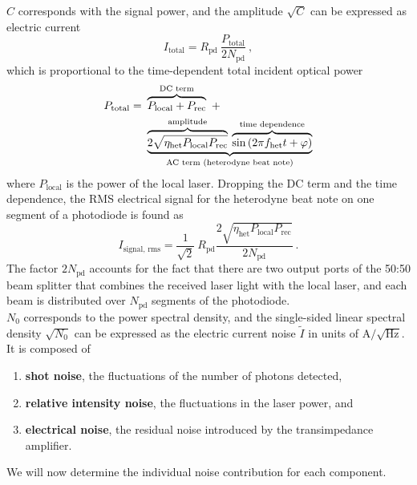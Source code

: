 \documentclass[fleqn,10pt]{<approot>/designer/latexelements/SelfArx} %
\begin{document}
$C$ corresponds with the signal power, and the amplitude $\sqrt{C}$ can be expressed as electric current
\begin{equation}
I_\text{total} = R_\text{pd}\:\frac{P_\text{total}}{2N_\text{pd}} ~ ,
\label{eq:totalincidentcurrent}
\end{equation}
which is proportional to the time-dependent total incident optical power
\begin{equation}
\begin{split}
 P_\text{total} = ~ & \overbrace{P_\text{local} + P_\text{rec}}^{\text{DC term}} ~ + \\
&  \underbrace{\overbrace{2\sqrt{\eta_\text{het} P_\text{local} P_\text{rec} }}^{\text{amplitude}} \:\overbrace{\sin\left(2\pi f_\text{het}t+\varphi\right)}^{\text{time dependence}}}_\text{\text{AC term (heterodyne beat note)}}
\end{split}
\label{eq:totalincidentpower}
\end{equation}
where $P_\text{local}$ is the power of the local laser. Dropping the DC term and the time dependence, the RMS electrical signal for the heterodyne beat note on one segment of a photodiode is found as
\begin{equation}
I_\text{signal, rms} = \frac{1}{\sqrt{2}}\:R_\text{pd}\frac{2\sqrt{\eta_\text{het} P_\text{local} P_\text{rec} }}{2N_\text{pd}} ~ .
\label{eq:totalincidentrms}
\end{equation}
The factor $2N_\text{pd}$ accounts for the fact that there are two output ports of the 50:50 beam splitter that combines the received laser light with the local laser, and each beam is distributed over $N_\text{pd}$ segments of the photodiode.\\

$N_0$ corresponds to the power spectral density, and the single-sided linear spectral density $\sqrt{N_0}$ can be expressed as the electric current noise $\widetilde{I}$ in units of A$/\sqrt{\text{Hz}}$. It is composed of
\begin{enumerate}[noitemsep] %
\item \textbf{shot noise}, the fluctuations of the number of photons detected,
\item \textbf{relative intensity noise}, the fluctuations in the laser power, and
\item \textbf{electrical noise}, the residual noise introduced by the transimpedance amplifier.
\end{enumerate}
We will now determine the individual noise contribution for each component.
\end{document}
